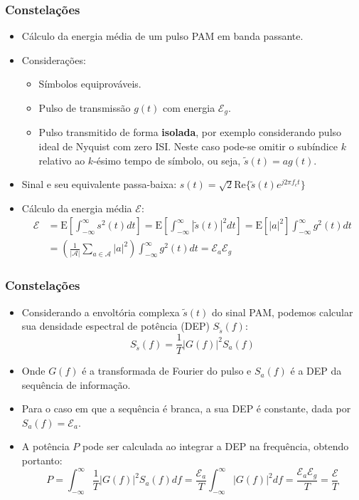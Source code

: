 \begin{frame}
	\frametitle{Constelações}

	\begin{itemize}
	    \item Cálculo da energia média de um pulso PAM em banda passante.
	    \item Considerações:
	    \begin{itemize}
		\item Símbolos equiprováveis.
		\item Pulso de transmissão $g(t)$ com energia $\mathcal{E}_g$.
		\item Pulso transmitido de forma \textbf{isolada}, por exemplo considerando pulso ideal de Nyquist com zero ISI. Neste caso pode-se omitir o subíndice $k$ relativo ao $k$-ésimo tempo de símbolo, ou seja, $\tilde{s}(t) = a g(t)$.
	    \end{itemize}
	    \item Sinal e seu equivalente passa-baixa: $s(t) = \sqrt{2} \mathrm{Re}\{ \tilde{s}(t) e^{j2\pi f_c t} \}$
	    \item Cálculo da energia média $\mathcal{E}$:
	    \begin{align*}
		\mathcal{E} &= \mathrm{E}\left[ \int_{-\infty}^{\infty} s^2(t) dt \right] = \mathrm{E} \left[ \int_{-\infty}^{\infty} |\tilde{s}(t)|^2 dt \right] = \mathrm{E}[|a|^2]\int_{-\infty}^{\infty} g^2(t) dt \\
		&= \left( \frac{1}{|\mathcal{A}|} \sum_{a \in \mathcal{A}} |a|^2 \right) \int_{-\infty}^{\infty} g^2(t) dt  =  \mathcal{E}_a \mathcal{E}_g
	    \end{align*}
	\end{itemize}	
\end{frame}

\begin{frame}
	\frametitle{Constelações}

	\begin{itemize}
	    \item Considerando a envoltória complexa $\tilde{s}(t)$ do sinal PAM, podemos calcular sua densidade espectral de potência (DEP) $S_{\tilde{s}}(f)$:
	    \begin{equation*}
		S_{\tilde{s}}(f) = \frac{1}{T}|G(f)|^2 S_{a}(f)
	    \end{equation*}
	    \item Onde $G(f)$ é a transformada de Fourier do pulso e $S_a(f)$ é a DEP da sequência de informação.
	    \item Para o caso em que a sequência é branca, a sua DEP é constante, dada por $S_a(f) = \mathcal{E}_a.$
	    \item A potência $P$ pode ser calculada ao integrar a DEP na frequência, obtendo portanto:
	    \begin{equation*}
		P = \int_{-\infty}^{\infty} \frac{1}{T} |G(f)|^2 S_a(f) df = \frac{\mathcal{E}_a}{T}\int_{-\infty}^{\infty} |G(f)|^2 df = \frac{\mathcal{E}_a\mathcal{E}_g}{T} = \frac{\mathcal{E}}{T}
	    \end{equation*}

	\end{itemize}	
\end{frame}

